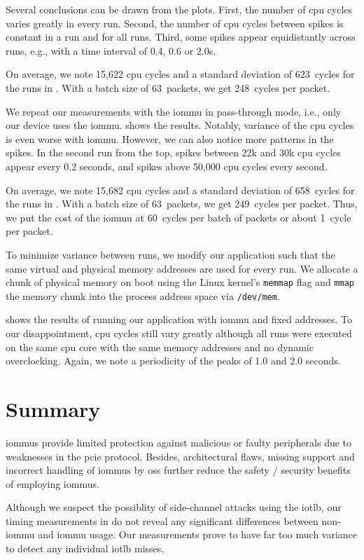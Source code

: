 Several conclusions can be drawn from the plots. First, the number of \ac{cpu}
cycles varies greatly in every run. Second, the number of \ac{cpu} cycles
between spikes is constant in a run and for all runs. Third, some spikes appear
equidistantly across runs, e.g., with a time interval of 0.4, 0.6 or 2.0s.

On average, we note 15,622 \ac{cpu} cycles and a standard deviation of
623~cycles for the runs in . With a batch size of
63~packets, we get 248~cycles per packet.

We repeat our measurements with the \ac{iommu} in pass-through mode, i.e., only
our device uses the \ac{iommu}.  shows the results.
Notably, variance of the \ac{cpu} cycles is even worse with \ac{iommu}. However,
we can also notice more patterns in the spikes. In the second run from the top,
spikes between 22k and 30k \ac{cpu} cycles appear every 0.2 seconds, and spikes
above 50,000 \ac{cpu} cycles every second.

On average, we note 15,682 \ac{cpu} cycles and a standard deviation of
658~cycles for the runs in . With a batch size of
63~packets, we get 249~cycles per packet. Thus, we put the cost of the
\ac{iommu} at 60~cycles per batch of packets or about 1~cycle per packet.

To minimize variance between runs, we modify our application such that the same
virtual and physical memory addresses are used for every run. We allocate a
chunk of physical memory on boot using the Linux kernel's \texttt{memmap} flag
and \texttt{mmap} the memory chunk into the process address space via
\texttt{/dev/mem}.

 shows the results of running our application
with \ac{iommu} and fixed addresses. To our disappointment, \ac{cpu} cycles
still vary greatly although all runs were executed on the same \ac{cpu} core
with the same memory addresses and no dynamic overclocking. Again, we note a
periodicity of the peaks of 1.0 and 2.0 seconds.


\section{Summary}
\label{sec:sec_summary}

\acp{iommu} provide limited protection against malicious or faulty peripherals
due to weaknesses in the \ac{pcie} protocol. Besides, architectural flaws,
missing support and incorrect handling of \acp{iommu} by \aclp{os} further
reduce the safety / security benefits of employing \acp{iommu}.

Although we suspect the possiblity of side-channel attacks using the \ac{iotlb},
our timing measurements in  do not reveal any significant
differences between non-\ac{iommu} and \ac{iommu} usage. Our measurements prove
to have far too much variance to detect any individual \ac{iotlb} misses.

